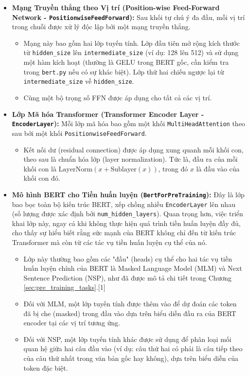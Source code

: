\begin{itemize}
    \item \textbf{Mạng Truyền thẳng theo Vị trí (Position-wise Feed-Forward Network - \texttt{PositionwiseFeedForward}):} Sau khối tự chú ý đa đầu, mỗi vị trí trong chuỗi được xử lý độc lập bởi một mạng truyền thẳng.
    \begin{itemize}
        \item Mạng này bao gồm hai lớp tuyến tính. Lớp đầu tiên mở rộng kích thước từ \texttt{hidden\_size} lên \texttt{intermediate\_size} (ví dụ: 128 lên 512) và sử dụng một hàm kích hoạt (thường là GELU trong BERT gốc, cần kiểm tra trong \texttt{bert.py} nếu có sự khác biệt). Lớp thứ hai chiếu ngược lại từ \texttt{intermediate\_size} về \texttt{hidden\_size}.
        \item Cùng một bộ trọng số FFN được áp dụng cho tất cả các vị trí.
    \end{itemize}

    \item \textbf{Lớp Mã hóa Transformer (Transformer Encoder Layer - \texttt{EncoderLayer}):} Mỗi lớp mã hóa bao gồm một khối \texttt{MultiHeadAttention} theo sau bởi một khối \texttt{PositionwiseFeedForward}.
    \begin{itemize}
        \item Kết nối dư (residual connection) được áp dụng xung quanh mỗi khối con, theo sau là chuẩn hóa lớp (layer normalization). Tức là, đầu ra của mỗi khối con là $\text{LayerNorm}(x + \text{Sublayer}(x))$, trong đó $x$ là đầu vào của khối con đó.
    \end{itemize}

    \item \textbf{Mô hình BERT cho Tiền huấn luyện (\texttt{BertForPreTraining}):} Đây là lớp bao bọc toàn bộ kiến trúc BERT, xếp chồng nhiều \texttt{EncoderLayer} lên nhau (số lượng được xác định bởi \texttt{num\_hidden\_layers}). Quan trọng hơn, việc triển khai lớp này, ngay cả khi không thực hiện quá trình tiền huấn luyện đầy đủ, cho thấy sự hiểu biết rằng sức mạnh của BERT không chỉ đến từ kiến trúc Transformer mà còn từ các tác vụ tiền huấn luyện cụ thể của nó.
    \begin{itemize}
        \item Lớp này thường bao gồm các "đầu" (heads) cụ thể cho hai tác vụ tiền huấn luyện chính của BERT là Masked Language Model (MLM) và Next Sentence Prediction (NSP), như đã được mô tả chi tiết trong Chương \ref{sec:pre_training_tasks}.[1]
        \item Đối với MLM, một lớp tuyến tính được thêm vào để dự đoán các token đã bị che (masked) trong đầu vào dựa trên biểu diễn đầu ra của BERT encoder tại các vị trí tương ứng.
        \item Đối với NSP, một lớp tuyến tính khác được sử dụng để phân loại mối quan hệ giữa hai câu đầu vào (ví dụ: câu thứ hai có phải là câu tiếp theo của câu thứ nhất trong văn bản gốc hay không), dựa trên biểu diễn của token \texttt{} đặc biệt.
    \end{itemize}
\end{itemize}
